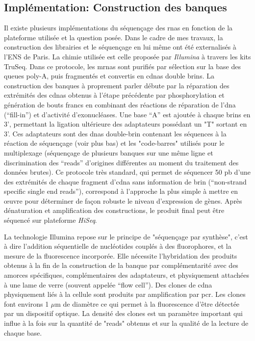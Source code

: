 \documentclass[../main.tex]{subfiles}
\begin{document}
\subsection{Implémentation: Construction des banques}
Il existe plusieurs implémentations du séquençage des \glspl{rna} en fonction de la plateforme utilisée et la question posée.
Dans le cadre de mes travaux, la construction des librairies et le séquençage en lui même ont été externalisés à l'ENS de Paris.
La chimie utilisée est celle proposée par \textit{Illumina} à travers les kits TruSeq.
Dans ce protocole, les \glspl{mrna} sont purifiés par sélection sur la base des queues poly-A, puis fragmentés et convertis en \glspl{cdna} double brins.
La construction des banques à proprement parler débute par la réparation des extrémités des \glspl{cdna} obtenus à l'étape précédente par phosphorylation et génération de bouts francs en combinant des réactions de réparation de l'\gls{dna} (``fill-in'') et d'activité d'exonucléases.
Une base ``A'' est ajoutée à chaque brins en 3', permettant la ligation ultérieure des adaptateurs possédant un "T" sortant en 3'.
Ces adaptateurs sont des \glspl{dna} double-brin contenant les séquences à la réaction de séquençage (voir plus bas) et les "code-barres" utilisés pour le multiplexage (séquençage de plusieurs banques sur une même ligne et discrimination des ``reads'' d'origines différentes au moment du traitement des données brutes).
Ce protocole très standard, qui permet de séquencer 50 \gls{pb} d'une des extrémités de chaque fragment d'\gls{cdna} sans information de brin (``non-strand specific single end reads''), correspond à l'approche la plus simple à mettre en œuvre pour déterminer de façon robuste le niveau d'expression de gènes.
Après dénaturation et amplification des constructions, le produit final peut être séquencé sur plateforme \textit{HiSeq}.
\par
La technologie Illumina repose sur le principe de "séquençage par synthèse", c'est à dire l'addition séquentielle de nucléotides couplés à des fluorophores, et la mesure de la fluorescence incorporée.
Elle nécessite l'hybridation des produits obtenus à la fin de la construction de la banque par complémentarité avec des amorces spécifiques, complémentaires des adaptateurs, et physiquement attachées à une lame de verre (souvent appelée ``flow cell'').
Des clones de \gls{cdna} physiquement liés à la cellule sont produits par amplification par \gls{pcr}.
Les clones font environs 1 $\mu$m de diamètre ce qui permet à la fluorescence d'être détectée par un dispositif optique.
La densité des clones est un paramètre important qui influe à la fois sur la quantité de "reads" obtenus et sur la qualité de la lecture de chaque base.
\end{document}
